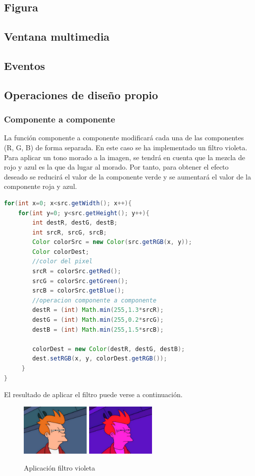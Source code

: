 \subsection{Figura}
\subsection{Ventana multimedia}
\subsection{Eventos}
\subsection{Operaciones de diseño propio}
\subsubsection{Componente a componente}
La función componente a componente modificará cada una de las componentes (R, G, B) de forma separada.\vskip0.3cm
En este caso se ha implementado un filtro violeta. Para aplicar un tono morado a la imagen, se tendrá en cuenta que la mezcla de rojo y azul es la que da lugar al morado. Por tanto, para obtener el efecto deseado se reducirá el valor de la componente verde y se aumentará el valor de la componente roja y azul.
\begin{lstlisting}[language=Java, caption=Operación componente a componente, label=lst:graddesc]
for(int x=0; x<src.getWidth(); x++){
    for(int y=0; y<src.getHeight(); y++){
        int destR, destG, destB;
        int srcR, srcG, srcB;
        Color colorSrc = new Color(src.getRGB(x, y));
        Color colorDest;
        //color del pixel
        srcR = colorSrc.getRed();
        srcG = colorSrc.getGreen();
        srcB = colorSrc.getBlue();
        //operacion componente a componente
        destR = (int) Math.min(255,1.3*srcR);
        destG = (int) Math.min(255,0.2*srcG);
        destB = (int) Math.min(255,1.5*srcB);
                
        colorDest = new Color(destR, destG, destB);
        dest.setRGB(x, y, colorDest.getRGB());
     }
}
\end{lstlisting}
El resultado de aplicar el filtro puede verse a continuación.
\vskip0.3cm
\begin{figure}[H]
 \centering
  \includegraphics[width=0.3\textwidth]{imagenes/Fry.jpg}
  \includegraphics[width=0.3\textwidth]{imagenes/fryVioleta.jpg}
 \caption{Aplicación filtro violeta}
 \label{diseño}
 \end{figure}

